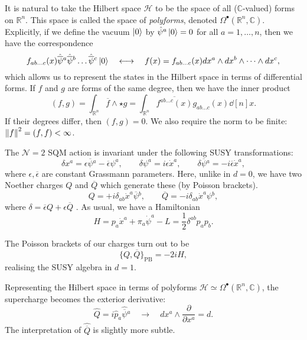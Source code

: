 It is natural to take the Hilbert space $\mathscr{H}$ to be the space of all ($\mathbb{C}$-valued) forms on $\mathbb{R}^n$. This space is called the space of \emph{polyforms}, denoted $\Omega^\bullet (\mathbb{R}^n, \mathbb{C})$. Explicitly, if we define the vacuum $\ket{0}$ by $\hat{\psi}^a \ket{0} = 0$ for all $a = 1, \dots, n$, then we have the correspondence
\begin{equation}
  f_{ab \dots c} (x) \hat{\overline{\psi}{}}{}^a \hat{\overline{\psi}{}}{}^b \dots \hat{\overline{\psi}{}}{}^c \ket{0} 
  \quad \longleftrightarrow \quad 
  f(x) = f_{ab \dots c} (x) dx^a \wedge dx^b \wedge \dots \wedge dx^c,
\end{equation}
which allows us to represent the states in the Hilbert space in terms of differential forms.
If $f$ and $g$ are forms of the same degree, then we have the inner product
\begin{equation}
  (f, g) = 
  \int_{\mathbb{R}^n} \overline{f}{} \wedge \star g = \int_{\mathbb{R}^n} \overline{f^{ab \dots c} (x)}{} g_{ab \dots c} (x) \dd[n]{x}.
\end{equation}
If their degrees differ, then $(f, g) = 0$.
We also require the norm to be finite: $ \norm{f}^2 = (f, f) < \infty$.

The $\mathcal{N} = 2$ SQM action is invariant under the following SUSY transformations:
\begin{equation}
  \delta x^a = \epsilon \overline{\psi}{}^a - \overline{\epsilon}{} \psi^a, \qquad \delta \psi^a = i \epsilon \dot{x}^a, \qquad \delta \overline{\psi}{}^a = -i \overline{\epsilon}{} \dot{x}^a,
\end{equation}
where $\epsilon, \overline{\epsilon}{}$  are constant Grassmann parameters. Here, unlike in $d = 0$, we have two Noether charges $Q$ and $\overline{Q}{}$ which generate these (by Poisson brackets).
\begin{equation}
  Q = +i \delta_{ab} \dot{x}^a \overline{\psi}{}^b, \qquad
  \overline{Q}{} = -i \delta_{ab} \dot{x}^a {\psi}{}^b,
\end{equation}
where $\delta = \overline{\epsilon}{} Q + \epsilon \overline{Q}{}$ .
As usual, we have a Hamiltonian
\begin{equation}
  H = p_a \dot{x}^a + \pi_a \dot{\psi}^a - L = \frac{1}{2} \delta^{ab} p_a p_b.
\end{equation}
\begin{claim}
  The Poisson brackets of our charges turn out to be
  \begin{equation}
    \{ Q, \overline{Q}{} \}_{\text{PB}} = -2i H,
  \end{equation}
  realising the SUSY algebra in $d = 1$.
\end{claim} 

Representing the Hilbert space in terms of polyforms $\mathscr{H} \simeq \Omega^\bullet (\mathbb{R}^n, \mathbb{C})$, the supercharge becomes the exterior derivative:
\begin{equation}
  \hat{Q} = i \hat{p}_a \hat{\overline{\psi}}{}^a 
  \quad \longrightarrow\quad  
  dx^a \wedge \frac{\partial }{\partial x^a} = d.
\end{equation}
The interpretation of $\hat{\overline{Q}{}}$ is slightly more subtle.
